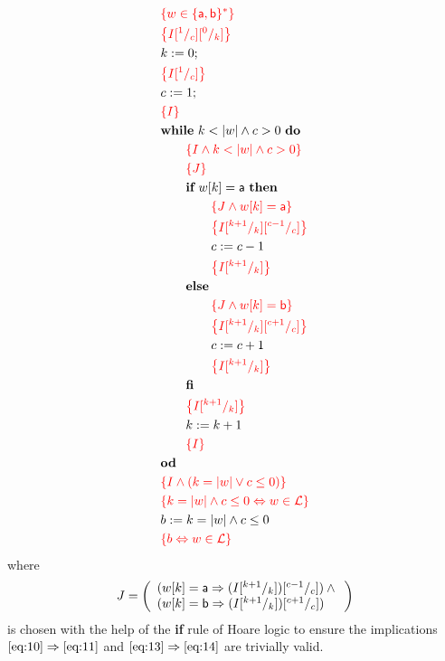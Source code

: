\documentclass[a4paper]{scrartcl}
\newcommand{\ah}{\mathsf{a}}
\newcommand{\be}{\mathsf{b}}
\newcommand{\assn}[1]{{\color{red}\left\{#1\right\}}}
\def\L{\mathcal{L}}
\begin{document}
\begin{align}
  & \assn{w\in\{\ah,\be\}^*}\label{eq:1}\\
  & \assn{I\subst 1c\subst 0k}\label{eq:2}\\
  & k\Ass 0;\notag\\
  & \assn{I\subst 1c}\label{eq:3}\\
  & c\Ass 1;\notag\\
  & \assn{I}\label{eq:4}\\
  & \WHILE~k < |w|\And c > 0~\DO\notag\\
  & \qquad\assn{I\And k < |w|\And c > 0}\label{eq:5}\\
  & \qquad \assn{J}\label{eq:6}\\
  & \qquad \IF~w[k] = \ah~\THEN\notag\\
  & \qquad\qquad \assn{J\And w[k] = \ah}\label{eq:10}\\
  & \qquad\qquad \assn{I\subst{k+1}k\subst{c-1}c}\label{eq:11}\\
  & \qquad\qquad c\Ass c-1\notag\\
  & \qquad\qquad \assn{I\subst{k+1}k}\label{eq:12}\\
  & \qquad \ELSE\notag\\
  & \qquad\qquad \assn{J\And w[k] = \be}\label{eq:13}\\
  & \qquad\qquad \assn{I\subst{k+1}k\subst{c+1}c}\label{eq:14}\\
  & \qquad\qquad c\Ass c+1\notag\\
  & \qquad\qquad \assn{I\subst{k+1}k}\label{eq:15}\\
  & \qquad \FI\notag\\
  & \qquad \assn{I\subst{k+1}k}\label{eq:16}\\
  & \qquad k\Ass k+1\notag\\
  & \qquad \assn{I}\label{eq:17}\\
  & \OD\notag\\
  & \assn{I\And (k = |w|\Or c \leq 0)}\label{eq:18}\\
  & \assn{k=|w|\And c \leq 0\Equiv w\in \L}\label{eq:19}\\
  & b\Ass k=|w|\And c \leq 0\notag\\
  & \assn{b\Equiv w\in \L}\label{eq:20}
\end{align}
where
\begin{gather*}
  J = \left(
    \begin{array}[c]{l}
      (w[k]=\ah \Implies (I\subst{k+1}k)\subst{c-1}c)\And{}\\
      (w[k]=\be \Implies (I\subst{k+1}k)\subst{c+1}c)
    \end{array}
  \right)
\end{gather*}
is chosen with the help of the \textbf{if} rule of Hoare logic to
ensure the implications $\eqref{eq:10}\Rightarrow\eqref{eq:11}$ and
$\eqref{eq:13}\Rightarrow\eqref{eq:14}$ are trivially valid.
\end{document}
